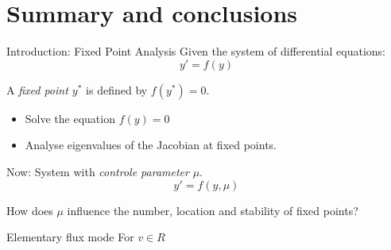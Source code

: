 \documentclass{beamer}
\begin{document}
\section{Summary and conclusions}

\begin{frame}{Introduction: Fixed Point Analysis}
    Given the system of differential equations:
    $$y' = f(y) $$
    \begin{definition}
        A \emph{fixed point $y^*$} is defined by $f(y^*)=0$.
    \end{definition}
    \begin{itemize}
        \item Solve the equation $f(y) = 0$ 
        \item Analyse eigenvalues of the Jacobian at fixed points.
    \end{itemize}
    Now: System with \emph{controle parameter} $\mu$. 
    $$y' = f(y, \mu)$${}    
    \begin{block}{}
        How does $\mu$ influence the number, location and stability of fixed points?
    \end{block}
\end{frame}


\begin{frame}{Elementary flux mode}
    For $v \in R$
\end{frame}
\end{document}
